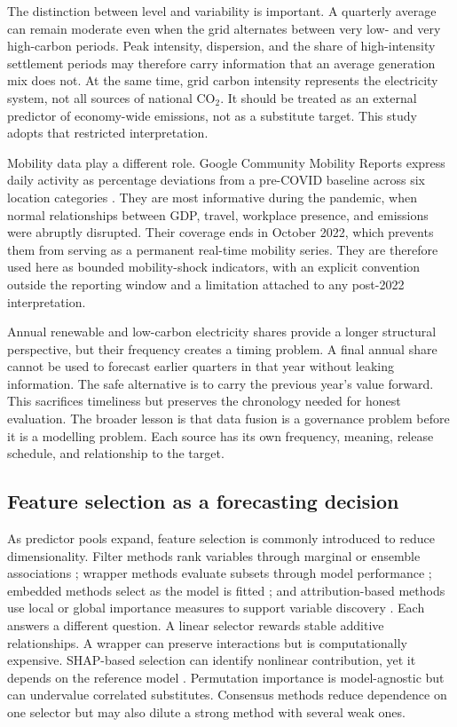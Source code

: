\documentclass[preprint,12pt]{elsarticle}
\newcommand{\coo}{CO$_2$}
\begin{document}
The distinction between level and variability is important. A quarterly average can remain moderate even when the grid alternates between very low- and very high-carbon periods. Peak intensity, dispersion, and the share of high-intensity settlement periods may therefore carry information that an average generation mix does not. At the same time, grid carbon intensity represents the electricity system, not all sources of national \coo{}. It should be treated as an external predictor of economy-wide emissions, not as a substitute target. This study adopts that restricted interpretation.

Mobility data play a different role. Google Community Mobility Reports express daily activity as percentage deviations from a pre-COVID baseline across six location categories \citep{googlemobility2022}. They are most informative during the pandemic, when normal relationships between GDP, travel, workplace presence, and emissions were abruptly disrupted. Their coverage ends in October 2022, which prevents them from serving as a permanent real-time mobility series. They are therefore used here as bounded mobility-shock indicators, with an explicit convention outside the reporting window and a limitation attached to any post-2022 interpretation.

Annual renewable and low-carbon electricity shares provide a longer structural perspective, but their frequency creates a timing problem. A final annual share cannot be used to forecast earlier quarters in that year without leaking information. The safe alternative is to carry the previous year's value forward. This sacrifices timeliness but preserves the chronology needed for honest evaluation. The broader lesson is that data fusion is a governance problem before it is a modelling problem. Each source has its own frequency, meaning, release schedule, and relationship to the target.

\subsection{Feature selection as a forecasting decision}

As predictor pools expand, feature selection is commonly introduced to reduce dimensionality. Filter methods rank variables through marginal or ensemble associations \citep{guyon2003,eskandari2024energy}; wrapper methods evaluate subsets through model performance \citep{kohavi1997,eskandari2024energy}; embedded methods select as the model is fitted \citep{zhao2023frequency}; and attribution-based methods use local or global importance measures to support variable discovery \citep{sui2025attribution}. Each answers a different question. A linear selector rewards stable additive relationships. A wrapper can preserve interactions but is computationally expensive. SHAP-based selection can identify nonlinear contribution, yet it depends on the reference model \citep{vanzyl2024xai}. Permutation importance is model-agnostic but can undervalue correlated substitutes. Consensus methods reduce dependence on one selector but may also dilute a strong method with several weak ones.
\end{document}
